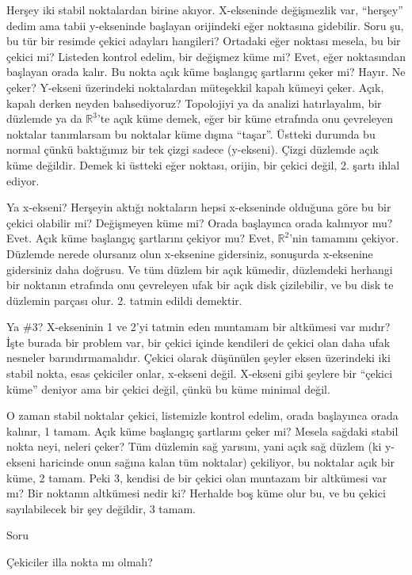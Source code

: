 \documentclass[12pt,fleqn]{article}\usepackage{../../common}
\begin{document}
Herşey iki stabil noktalardan birine akıyor. X-ekseninde değişmezlik var,
``herşey'' dedim ama tabii y-ekseninde başlayan orijindeki eğer noktasına
gidebilir. Soru şu, bu tür bir resimde çekici adayları hangileri? Ortadaki
eğer noktası mesela, bu bir çekici mi? Listeden kontrol edelim, bir
değişmez küme mi? Evet, eğer noktasından başlayan orada kalır. Bu nokta
açık küme başlangıç şartlarını çeker mi? Hayır. Ne çeker? Y-ekseni
üzerindeki noktalardan müteşekkil kapalı kümeyi çeker. Açık, kapalı derken
neyden bahsediyoruz? Topolojiyi ya da analizi hatırlayalım, bir düzlemde ya
da $\mathbb{R}^3$'te açık küme demek, eğer bir küme etrafında onu
çevreleyen noktalar tanımlarsam bu noktalar küme dışına ``taşar''. Üstteki
durumda bu normal çünkü baktığımız bir tek çizgi sadece (y-ekseni). Çizgi
düzlemde açık küme değildir. Demek ki üstteki eğer noktası, orijin, bir
çekici değil, 2. şartı ihlal ediyor.

Ya x-ekseni? Herşeyin aktığı noktaların hepsi x-ekseninde olduğuna göre bu
bir çekici olabilir mi? Değişmeyen küme mi? Orada başlayınca orada
kalınıyor mu? Evet. Açık küme başlangıç şartlarını çekiyor mu? Evet,
$\mathbb{R}^2$'nin tamamını çekiyor. Düzlemde nerede olursanız olun
x-eksenine gidersiniz, sonuşurda x-eksenine gidersiniz daha doğrusu. Ve tüm
düzlem bir açık kümedir, düzlemdeki herhangi bir noktanın etrafında onu
çevreleyen ufak bir açık disk çizilebilir, ve bu disk te düzlemin parçası
olur. 2. tatmin edildi demektir. 

Ya \#3? X-ekseninin 1 ve 2'yi tatmin eden muntamam bir altkümesi var mıdır?
İşte burada bir problem var, bir çekici içinde kendileri de çekici olan
daha ufak nesneler barındırmamalıdır. Çekici olarak düşünülen şeyler eksen
üzerindeki iki stabil nokta, esas çekiciler onlar, x-ekseni değil. X-ekseni
gibi şeylere bir ``çekici küme'' deniyor ama bir çekici değil, çünkü bu
küme minimal değil. 

O zaman stabil noktalar çekici, listemizle kontrol edelim, orada başlayınca
orada kalınır, 1 tamam. Açık küme başlangıç şartlarını çeker mi? Mesela
sağdaki stabil nokta neyi, neleri çeker? Tüm düzlemin sağ yarısını, yani
açık sağ düzlem (ki y-ekseni haricinde onun sağına kalan tüm noktalar)
çekiliyor, bu noktalar açık bir küme, 2 tamam. Peki 3, kendisi de bir çekici
olan muntazam bir altkümesi var mı? Bir noktanın altkümesi nedir ki?
Herhalde boş küme olur bu, ve bu çekici sayılabilecek bir şey değildir, 3
tamam. 

Soru

Çekiciler illa nokta mı olmalı?
\end{document}
